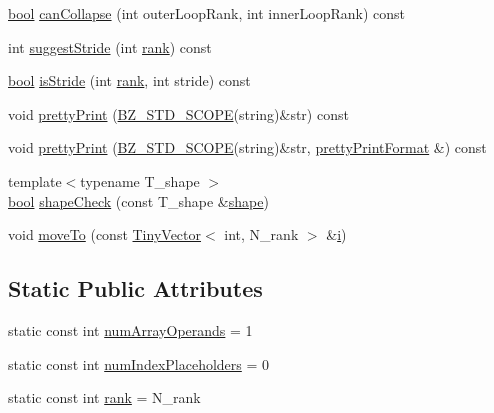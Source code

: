 \begin{DoxyCompactItemize}
\item 
\hyperlink{compiler_8h_abb452686968e48b67397da5f97445f5b}{bool} \hyperlink{classStencilExpr_a28d047f72fa5bcc8f50d19e6f12b4c88}{can\+Collapse} (int outer\+Loop\+Rank, int inner\+Loop\+Rank) const 
\item 
int \hyperlink{classStencilExpr_ae82fb13882e536a3446cf2b317b69d4f}{suggest\+Stride} (int \hyperlink{classStencilExpr_ad3f5edc99b864f011b2d88bce7ac3b48}{rank}) const 
\item 
\hyperlink{compiler_8h_abb452686968e48b67397da5f97445f5b}{bool} \hyperlink{classStencilExpr_a9b1de8b6699d3b611ed693b57b102ae2}{is\+Stride} (int \hyperlink{classStencilExpr_ad3f5edc99b864f011b2d88bce7ac3b48}{rank}, int stride) const 
\item 
void \hyperlink{classStencilExpr_a57970469e99923e7ae34b6e3c404cde9}{pretty\+Print} (\hyperlink{numinquire_8h_a2b24ffc3b4ef9803956bc7715c6c7b83}{B\+Z\+\_\+\+S\+T\+D\+\_\+\+S\+C\+O\+P\+E}(string)\&str) const 
\item 
void \hyperlink{classStencilExpr_a928617036c65131424d74a42faf1a05a}{pretty\+Print} (\hyperlink{numinquire_8h_a2b24ffc3b4ef9803956bc7715c6c7b83}{B\+Z\+\_\+\+S\+T\+D\+\_\+\+S\+C\+O\+P\+E}(string)\&str, \hyperlink{classprettyPrintFormat}{pretty\+Print\+Format} \&) const 
\item 
{\footnotesize template$<$typename T\+\_\+shape $>$ }\\\hyperlink{compiler_8h_abb452686968e48b67397da5f97445f5b}{bool} \hyperlink{classStencilExpr_ab0df605c5509373ae66780b38b1b3f41}{shape\+Check} (const T\+\_\+shape \&\hyperlink{shape_8h_a9d9da3dcaecbbde6cf1961063f2e838b}{shape})
\item 
void \hyperlink{classStencilExpr_a4813e8827392cab12bc773a25e3e4a78}{move\+To} (const \hyperlink{classTinyVector}{Tiny\+Vector}$<$ int, N\+\_\+rank $>$ \&\hyperlink{indexexpr_8h_aabd77643995707c185e95c8cb2782c81}{i})
\end{DoxyCompactItemize}
\subsection*{Static Public Attributes}
\begin{DoxyCompactItemize}
\item 
static const int \hyperlink{classStencilExpr_a20c4d644c82cdaf9af6ab1a419dc1a9d}{num\+Array\+Operands} = 1
\item 
static const int \hyperlink{classStencilExpr_a7fe20bd5aa8c981d33a1e06dde54f9b6}{num\+Index\+Placeholders} = 0
\item 
static const int \hyperlink{classStencilExpr_ad3f5edc99b864f011b2d88bce7ac3b48}{rank} = N\+\_\+rank
\end{DoxyCompactItemize}
